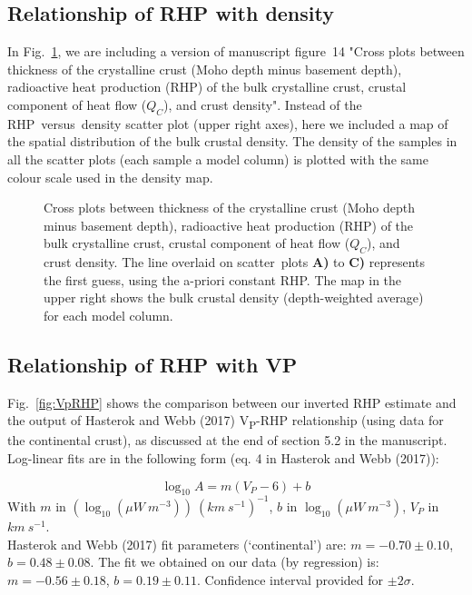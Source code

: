 {\begin{subappendices}
\subsection{Relationship of RHP with density}
\label{ss:ApplSup:Rel:Rho}

In Fig.~\ref{fig:RhoRHP}, we are including a version of manuscript figure~14 "Cross plots between thickness of the crystalline crust (Moho depth minus basement depth), radioactive heat production (RHP) of the bulk crystalline crust, crustal component of heat flow ($Q_C$), and crust density".
Instead of the RHP~versus~density scatter plot (upper right axes), here we included a map of the spatial distribution of the bulk crustal density.
The density of the samples in all the scatter plots (each sample a model column) is plotted with the same colour scale used in the density map.

\begin{figure}
	\begin{adjustbox}{center}
	\end{adjustbox}
	\caption{Cross plots between thickness of the crystalline crust (Moho depth minus basement depth), radioactive heat production (RHP) of the bulk crystalline crust, crustal component of heat flow ($Q_C$), and crust density. The line overlaid on scatter~plots \textbf{A)} to \textbf{C)} represents the first guess, using the a-priori constant RHP.
	The map in the upper right shows the bulk crustal density (depth-weighted average) for each model column.}
	\label{fig:RhoRHP}
\end{figure}

\subsection{Relationship of RHP with VP}
\label{ss:ApplSup:Rel:VP}

Fig.~\ref{fig:VpRHP} shows the comparison between our inverted RHP estimate and the output of Hasterok and Webb (2017) V\textsubscript{P}-RHP relationship (using data for the continental crust), as discussed at the end of section 5.2 in the manuscript.
Log-linear fits are in the following form (eq. 4 in Hasterok and Webb (2017)):

\begin{equation*}
	\log_{10} A = m (V_{P} - 6) + b
\end{equation*}
With $m$ in $(\log_{10} (\mu W \ m^{-3})) \ (km \ s^{-1})^{-1}$, $b$ in $\log_{10} (\mu W \ m^{-3})$, $V_{P}$ in $km \ s^{-1}$. \\
Hasterok and Webb (2017) fit parameters (`continental') are: $m = -0.70 \pm 0.10$, $b = 0.48 \pm 0.08$.
The fit we obtained on our data (by regression) is: $m = -0.56 \pm 0.18$, $b = 0.19 \pm 0.11$.
Confidence interval provided for $\pm 2 \sigma$.


\end{subappendices}}
